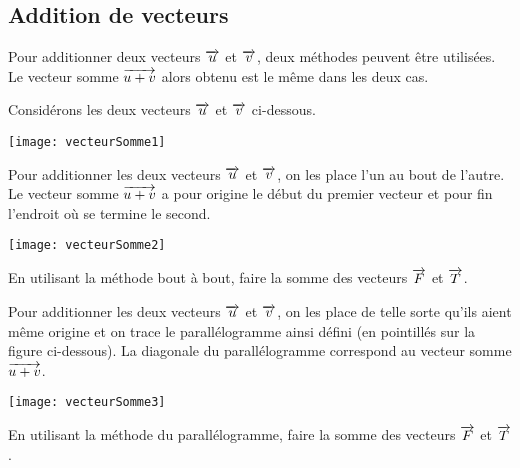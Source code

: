 \subsection{Addition de vecteurs}

Pour additionner deux vecteurs $\overrightarrow{u}$ et $\overrightarrow{v}$, deux méthodes peuvent être utilisées. Le vecteur somme $\overrightarrow{u+v}$ alors obtenu est le même dans les deux cas. 

Considérons les deux vecteurs $\overrightarrow{u}$ et $\overrightarrow{v}$ ci-dessous.

\begin{center}
    \texttt{[image: vecteurSomme1]}
\end{center}


\begin{methode}
\label{methodeAddBoutBout}

Pour additionner les deux vecteurs $\overrightarrow{u}$ et $\overrightarrow{v}$, on les place l'un au bout de l'autre. Le vecteur somme $\overrightarrow{u+v}$ a pour origine le début du premier vecteur et pour fin l'endroit où se termine le second.

\begin{center}
    \texttt{[image: vecteurSomme2]}
\end{center}

\exercice
En utilisant la méthode bout à bout, faire la somme des vecteurs $\overrightarrow{F}$ et $\overrightarrow{T}$.

\correction
\vspace{.5em}
\end{methode}


\begin{methode}
\label{methodeAddParall}

Pour additionner les deux vecteurs $\overrightarrow{u}$ et $\overrightarrow{v}$, on les place de telle sorte qu'ils aient même origine et on trace le parallélogramme ainsi défini (en pointillés sur la figure ci-dessous). La diagonale du parallélogramme correspond au vecteur somme $\overrightarrow{u+v}$.

\begin{center}
    \texttt{[image: vecteurSomme3]}
\end{center}

\exercice
En utilisant la méthode du parallélogramme, faire la somme des vecteurs $\overrightarrow{F}$ et $\overrightarrow{T}$.
\correction
\vspace{.5em}
\end{methode}



